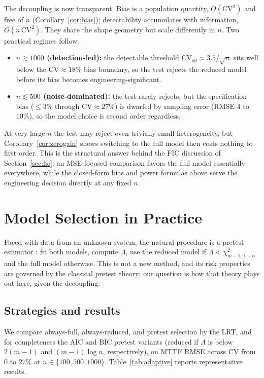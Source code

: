 \documentclass[11pt]{article}
\newcommand{\CV}{\mathrm{CV}}
\begin{document}
The decoupling is now transparent. Bias is a population quantity, $O(\CV^2)$ and free of $n$ (Corollary~\ref{cor:bias}); detectability accumulates with information, $O(n\,\CV^2)$. They share the shape geometry but scale differently in $n$. Two practical regimes follow:
\begin{itemize}
\item \textbf{$n \gtrsim 1000$ (detection-led):} the detectable threshold $\CV_{50}\approx 3.5/\sqrt{n}$ sits well below the $\CV\approx 18\%$ bias boundary, so the test rejects the reduced model before its bias becomes engineering-significant.
\item \textbf{$n \lesssim 500$ (noise-dominated):} the test rarely rejects, but the specification bias ($\leq 3\%$ through $\CV\approx 27\%$) is dwarfed by sampling error (RMSE $4$ to $10\%$), so the model choice is second order regardless.
\end{itemize}
At very large $n$ the test may reject even trivially small heterogeneity, but Corollary~\ref{cor:zerogain} shows switching to the full model then costs nothing to first order. This is the structural answer behind the FIC discussion of Section~\ref{sec:fic}: an MSE-focused comparison favors the full model essentially everywhere, while the closed-form bias and power formulas above serve the engineering decision directly at any fixed $n$.

\section{Model Selection in Practice}
\label{sec:adaptive}

Faced with data from an unknown system, the natural procedure is a pretest estimator \citep{bancroft1944, judge1978}: fit both models, compute $\Lambda$, use the reduced model if $\Lambda < \chi^2_{m-1,\,1-\alpha}$ and the full model otherwise. This is not a new method, and its risk properties are governed by the classical pretest theory; our question is how that theory plays out here, given the decoupling.

\subsection{Strategies and results}

We compare always-full, always-reduced, and pretest selection by the LRT, and for completeness the AIC and BIC pretest variants (reduced if $\Lambda$ is below $2(m-1)$ and $(m-1)\log n$, respectively), on MTTF RMSE across $\CV$ from $0$ to $27\%$ at $n \in \{100,500,1000\}$. Table~\ref{tab:adaptive} reports representative results.
\end{document}
